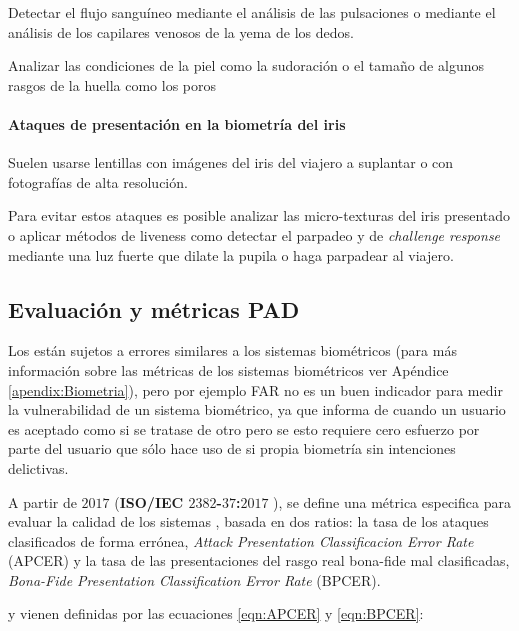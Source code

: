 Detectar el flujo sanguíneo mediante el análisis de las pulsaciones o mediante el análisis de los capilares venosos de la yema de los dedos.

Analizar las condiciones de la piel como la sudoración o el tamaño de algunos rasgos de la huella como los poros

\paragraph{Ataques de presentación en la biometría del iris}
Suelen usarse lentillas con imágenes del iris del viajero a suplantar o con fotografías de alta resolución.

Para evitar estos ataques es posible analizar las micro-texturas del iris presentado o aplicar métodos de \gls{liveness} como detectar el parpadeo y de \textit{\gls{challenge response}} mediante una luz fuerte que dilate la pupila o haga parpadear al viajero.


\subsection{Evaluación y métricas PAD}\label{sec:MetricasEvaluacionPAD}

Los  están sujetos a errores similares a los sistemas biométricos (para más información sobre las métricas de los sistemas biométricos ver Apéndice \ref{apendix:Biometria}), pero por ejemplo \Gls{FAR} no es un buen indicador para medir la vulnerabilidad de un sistema biométrico, ya que informa de cuando un usuario es aceptado como si se tratase de otro pero se esto requiere cero esfuerzo por parte del usuario que sólo hace uso de si propia biometría sin intenciones delictivas.

A partir de $2017$ (\textbf{ISO/IEC $2382$-$37$:$2017$} \cite{ISO/PADEvaluation}), se define una métrica especifica para evaluar la calidad de los sistemas , basada en dos ratios: la tasa de los ataques clasificados de forma errónea, \textit{Attack Presentation Classificacion Error Rate} (\gls{APCER}) y la tasa de las presentaciones del rasgo real \gls{bona-fide} mal clasificadas, \textit{Bona-Fide Presentation Classification Error Rate} (\gls{BPCER}).

 y  vienen definidas por las ecuaciones \eqref{eqn:APCER} y \eqref{eqn:BPCER}:

